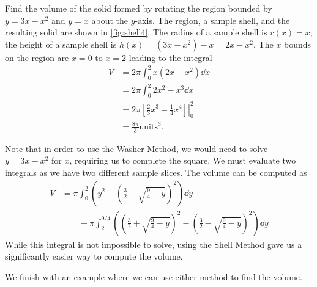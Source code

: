 \begin{example}\label{ex_shell4}
Find the volume of the solid formed by rotating the region bounded by $y=3x-x^2$ and $y=x$ about the $y$-axis.
\solution
The region, a sample shell, and the resulting solid are shown in \autoref{fig:shell4}. The radius of a sample shell is $r(x)=x$; the height of a sample shell is $h(x)=(3x-x^2)-x=2x-x^2$. The $x$ bounds on the region are $x=0$ to $x=2$ leading to the integral
\begin{align*}
V&=2\pi \int_0^2 x(2x-x^2) \dd x\\
&=2\pi \int_0^2 2x^2-x^3 \dd x\\
&=2\pi \left.\left[ \frac23 x^3-\frac14 x^4 \right] \right|_0^2\\
&=\frac{8\pi}{3} \text{units}^3.
\end{align*}

Note that in order to use the Washer Method, we would need to solve $y=3x-x^2$ for $x$, requiring us to complete the square. We must evaluate two integrals as we have two different sample slices. The volume can be computed as 
\begin{align*}
V&=\pi\int_0^2\left(y^2-\left(\frac32-\sqrt{\frac94 -y}\right)^2\right)\dd y \\
&\qquad+\pi\int_2^{9/4}\left(\left(\frac32+\sqrt{\frac94 -y}\right)^2
-\left(\frac32-\sqrt{\frac94 -y}\right)^2\right)\dd y
\end{align*}
While this integral is not impossible to solve, using the Shell Method gave us a significantly easier way to compute the volume.
\end{example}

We finish with an example where we can use either method to find the volume.

